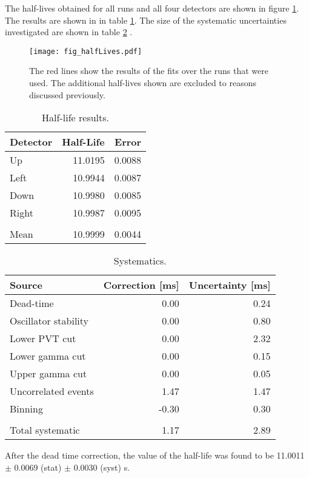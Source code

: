 \documentclass[MaxHughesThesis.tex]{subfiles}
\begin{document}
The half-lives obtained for all runs and all four detectors are shown in figure \ref{fig:PVT2by2}.
The results  are shown in  in table \ref{tab:PVTTable}.
The size of the systematic uncertainties investigated are shown in table \ref{tab:SysTable} .
\begin{figure}[!htb]
	\centerline{\texttt{[image: fig\_halfLives.pdf]}}
	\caption{The red lines show the results of the fits over the runs that were used.
		 The additional half-lives shown are excluded to reasons discussed previously. 
		}
	\label{fig:PVT2by2}
\end{figure}
	\begin{table}[!hbt]
			\centering
			\caption{Half-life results.}
			\begin{tabular}{lrr}
			Detector & Half-Life & Error \\ \hline
			Up & 11.0195 & 0.0088 \\
			Left & 10.9944 & 0.0087 \\
			Down & 10.9980 & 0.0085 \\
			Right & 10.9987 & 0.0095 \\ 
			      &		& 	 \\
			Mean & 10.9999 & 0.0044
			\end{tabular}
			\label{tab:PVTTable}
	\end{table}
\begin{table}[!hbt]
	\caption{Systematics.}
	\centering
	\label{tab:err-budget}
		\begin{tabular}{lrr}
		Source & Correction [ms] & Uncertainty [ms] \\ \hline
		Dead-time & 0.00 & 0.24 \\
		Oscillator stability & 0.00 & 0.80 \\
		Lower PVT cut & 0.00 & 2.32 \\
		Lower gamma cut & 0.00 &  0.15\\
		Upper gamma cut  & 0.00 & 0.05 \\ 
		Uncorrelated events & 1.47 & 1.47 \\
		Binning & -0.30 & 0.30 \\
			&	&	\\
		Total systematic & 1.17 & 2.89
		\end{tabular}
	\label{tab:SysTable}
\end{table}
After the dead time correction, the value of the half-life was found to be 11.0011 $\pm$ 0.0069 (stat) $\pm$ 0.0030 (syst) s.
\end{document}
